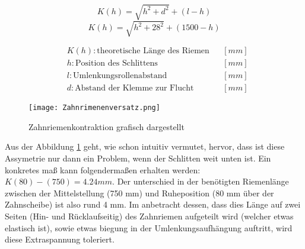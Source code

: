     \vspace{4mm}
    \noindent\begin{minipage}{\textwidth}
    \begin{minipage}[t]{0.5\textwidth}
        \begin{equation*}
            K(h) = \sqrt{h^2+d^2}+(l-h)
        \end{equation*}
        \begin{equation*}
            K(h) = \sqrt{h^2+28^2}+(1500-h)
        \end{equation*}
    \end{minipage}%
    \begin{minipage}[t]{0.5\textwidth}
        \vspace{-7mm}
        \begin{align*}
            &K(h): \text{theoretische Länge des Riemen} & &\left[mm\right]\\
            &h: \text{Position des Schlittens} & &\left[mm\right]\\
            &l: \text{Umlenkungsrollenabstand} & &\left[mm\right]\\
            &d: \text{Abstand der Klemme zur Flucht} & &\left[mm\right]
        \end{align*}
    \end{minipage}
    \end{minipage}

    \begin{figure}[H]
        \centering
        \texttt{[image: Zahnrimenenversatz.png]}
        \caption{Zahnriemenkontraktion grafisch dargestellt}
        \label{zahnriemenversatz}
    \end{figure}

Aus der Abbildung \ref{zahnriemenversatz} geht, wie schon intuitiv vermutet, hervor, dass ist diese Assymetrie nur dann ein Problem, wenn der Schlitten weit unten ist. Ein konkretes maß kann folgendermaßen erhalten werden: \(K(80) - (750) = 4.24 \unit{mm}\). Der unterschied in der benötigten Riemenlänge zwischen der Mittelstellung (750 mm) und Ruheposition (80 mm über der Zahnscheibe) ist also rund 4 mm. Im anbetracht dessen, dass dies Länge auf zwei Seiten (Hin- und Rücklaufseitig) des Zahnriemen aufgeteilt wird (welcher etwas elastisch ist), sowie etwas biegung in der Umlenkungsaufhängung auftritt, wird diese Extraspannung toleriert.

